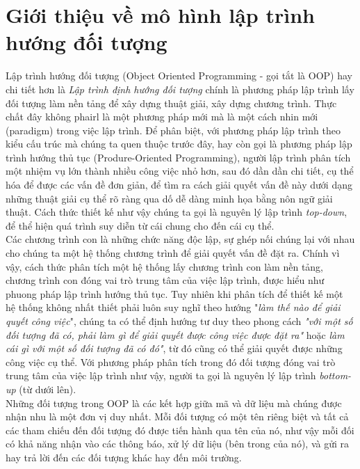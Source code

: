 \documentclass[10pt, a4paper]{article}
\begin{document}
\section{Giới thiệu về mô hình lập trình hướng đối tượng}

Lập trình hướng đối tượng (Object Oriented Programming - gọi tắt là OOP) hay chi tiết hơn là \emph{Lập trình định hướng đối tượng} chính là phương pháp lập trình lấy đối tượng làm nền tảng để xây dựng thuật giải, xây dựng chương trình. Thực chất đây không phairl là một phương pháp mới mà là một cách nhin mới (paradigm) trong việc lập trình. Để phân biệt, với phương pháp lập trình theo kiểu cấu trúc mà chúng ta quen thuộc trước đây, hay còn gọi là phương pháp lập trình hướng thủ tục (Produre-Oriented Programming), người lập trình phân tích một nhiệm vụ lớn thành nhiều công việc nhỏ hơn, sau đó dần dần chi tiết, cụ thể hóa để được các vấn đề đơn giản, để tìm ra cách giải quyết vấn đề này dưới dạng những thuật giải cụ thể rõ ràng qua dố dễ dàng minh họa bằng nôn ngữ giải thuật. Cách thức thiết kế như vậy chúng ta gọi là nguyên lý lập trình \emph{top-down}, để thể hiện quá trình suy diễn từ cái chung cho đến cái cụ thể.\\

Các chương trình con là những chức năng độc lập, sự ghép nối chúng lại với nhau cho chúng ta một hệ thống chương trình để giải quyết vấn đề đặt ra. Chính vì vậy, cách thức phân tích một hệ thống lấy chương trình con làm nền tảng, chương trình con đóng vai trò trung tâm của việc lập trình, được hiểu như phuong pháp lập trình hướng thủ tục. Tuy nhiên khi phân tích để thiết kế một hệ thống không nhất thiết phải luôn suy nghĩ theo hướng "\emph{làm thế nào để giải quyết công việc}", chúng ta có thể định hướng tư duy theo phong cách \emph{"với một số đối tượng đã có, phải làm gì để giải quyết được công việc được đặt ra"} hoặc \emph{làm cái gì với một số đối tượng đã có đó"}, từ đó cũng có thể giải quyết được những công việc cụ thể. Với phương pháp phân tích trong đó đối tượng đóng vai trò trung tâm của việc lập trình như vậy, người ta gọi là nguyên lý lập trình \emph{bottom-up} (từ dưới lên).\\

Những đối tượng trong OOP là các kết hợp giữa mã và dữ liệu mà chúng được nhận nhu là một đơn vị duy nhất. Mỗi đối tượng có một tên riêng biệt và tất cả các tham chiếu đến đối tượng đó được tiến hành qua tên của nó, như vậy mỗi đối có khả năng nhận vào các thông báo, xử lý dữ liệu (bên trong của nó), và gửi ra hay trả lời đến các đối tượng khác hay đến môi trường.
\end{document}
